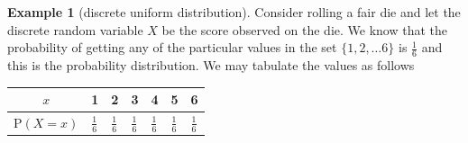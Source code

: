 \documentclass[
]{book}
\theoremstyle{definition}
\theoremstyle{definition}
\newtheorem{example}{Example}[chapter]
\theoremstyle{definition}
\theoremstyle{definition}
\theoremstyle{remark}
\begin{document}
\begin{example}[discrete uniform distribution]

Consider rolling a fair die and let the discrete random variable \(X\) be the score observed on the die. We know that the probability of getting any of the particular values in the set \(\{1,2, \dots 6\}\) is \(\frac{1}{6}\) and this is the probability distribution. We may tabulate the values as follows

\begin{longtable}[]{@{}cllllll@{}}
\toprule
\begin{minipage}[b]{0.28\columnwidth}\centering
\(x\)\strut
\end{minipage} & \begin{minipage}[b]{0.09\columnwidth}\raggedright
1\strut
\end{minipage} & \begin{minipage}[b]{0.09\columnwidth}\raggedright
2\strut
\end{minipage} & \begin{minipage}[b]{0.09\columnwidth}\raggedright
3\strut
\end{minipage} & \begin{minipage}[b]{0.09\columnwidth}\raggedright
4\strut
\end{minipage} & \begin{minipage}[b]{0.09\columnwidth}\raggedright
5\strut
\end{minipage} & \begin{minipage}[b]{0.09\columnwidth}\raggedright
6\strut
\end{minipage}\tabularnewline
\midrule
\endhead
\begin{minipage}[t]{0.28\columnwidth}\centering
\(\text{P}(X=x)\)\strut
\end{minipage} & \begin{minipage}[t]{0.09\columnwidth}\raggedright
\(\frac{1}{6}\)\strut
\end{minipage} & \begin{minipage}[t]{0.09\columnwidth}\raggedright
\(\frac{1}{6}\)\strut
\end{minipage} & \begin{minipage}[t]{0.09\columnwidth}\raggedright
\(\frac{1}{6}\)\strut
\end{minipage} & \begin{minipage}[t]{0.09\columnwidth}\raggedright
\(\frac{1}{6}\)\strut
\end{minipage} & \begin{minipage}[t]{0.09\columnwidth}\raggedright
\(\frac{1}{6}\)\strut
\end{minipage} & \begin{minipage}[t]{0.09\columnwidth}\raggedright
\(\frac{1}{6}\)\strut
\end{minipage}\tabularnewline
\bottomrule
\end{longtable}

\end{example}
\end{document}
